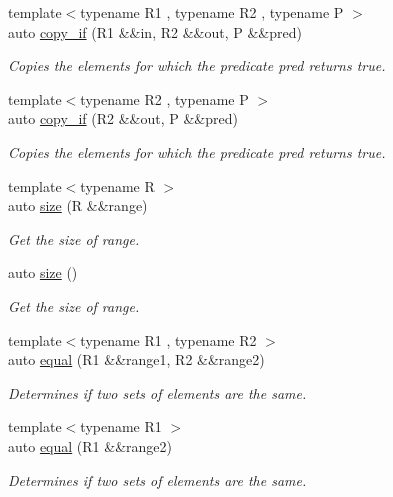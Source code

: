 \begin{DoxyCompactItemize}
{\footnotesize template$<$typename R1 , typename R2 , typename P $>$ }\\auto \mbox{\hyperlink{namespacerah_a550a133fe8c6de600a83959c82a0c592}{copy\+\_\+if}} (R1 \&\&in, R2 \&\&out, P \&\&pred)
\begin{DoxyCompactList}\small\item\em Copies the elements for which the predicate pred returns true. \end{DoxyCompactList}\item 
{\footnotesize template$<$typename R2 , typename P $>$ }\\auto \mbox{\hyperlink{namespacerah_a1f17e9431b258cc701fa59672a65d7db}{copy\+\_\+if}} (R2 \&\&out, P \&\&pred)
\begin{DoxyCompactList}\small\item\em Copies the elements for which the predicate pred returns true. \end{DoxyCompactList}\item 
{\footnotesize template$<$typename R $>$ }\\auto \mbox{\hyperlink{namespacerah_a85af749badb4261aa3c97a1d98134493}{size}} (R \&\&range)
\begin{DoxyCompactList}\small\item\em Get the size of range. \end{DoxyCompactList}\item 
auto \mbox{\hyperlink{namespacerah_aaee48fa7a804b4fd19c6a78bdd8d4c85}{size}} ()
\begin{DoxyCompactList}\small\item\em Get the size of range. \end{DoxyCompactList}\item 
{\footnotesize template$<$typename R1 , typename R2 $>$ }\\auto \mbox{\hyperlink{namespacerah_abf321dffb33d6a2d752aa091fdba7bbf}{equal}} (R1 \&\&range1, R2 \&\&range2)
\begin{DoxyCompactList}\small\item\em Determines if two sets of elements are the same. \end{DoxyCompactList}\item 
{\footnotesize template$<$typename R1 $>$ }\\auto \mbox{\hyperlink{namespacerah_a3434aacc26937d3ff50b5db4286feda6}{equal}} (R1 \&\&range2)
\begin{DoxyCompactList}\small\item\em Determines if two sets of elements are the same. \end{DoxyCompactList}\item 

\end{DoxyCompactItemize}
